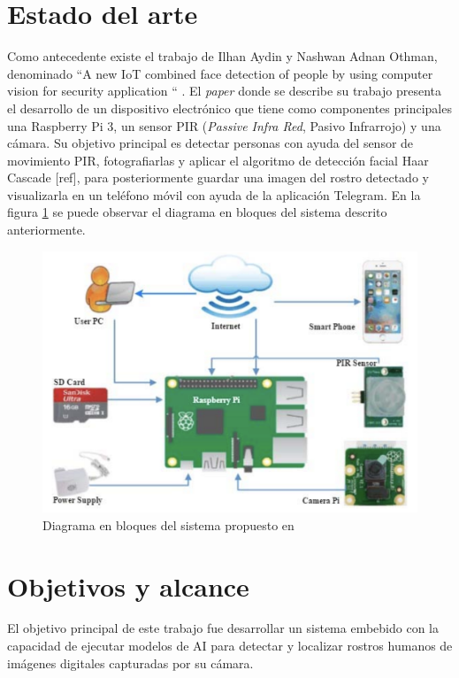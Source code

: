 \section{Estado del arte}
Como antecedente existe el trabajo de Ilhan Aydin y Nashwan Adnan Othman, denominado ``A new IoT combined face detection of people by using computer vision for security application
`` \cite{soa_ref}. El \textit{paper} donde se describe su trabajo presenta el desarrollo de un dispositivo electrónico que tiene como componentes principales una Raspberry Pi 3, un sensor PIR (\textit{Passive Infra Red}, Pasivo Infrarrojo) y una cámara. Su objetivo principal es detectar personas con ayuda del sensor de movimiento PIR, fotografiarlas y aplicar el algoritmo de detección facial Haar Cascade [ref], para posteriormente guardar una imagen del rostro detectado y visualizarla en un teléfono móvil con ayuda de la aplicación Telegram. En la figura \ref{fig:soa_arch} se puede observar el diagrama en bloques del sistema descrito anteriormente.

\begin{figure}[h]
	\centering
	\includegraphics[scale=0.4]{./Figures/soa_arch.png}
	\caption{Diagrama en bloques del sistema propuesto en \cite{soa_ref}}
	\label{fig:soa_arch}
\end{figure}

\section{Objetivos y alcance}
El objetivo principal de este trabajo fue desarrollar un sistema embebido con la capacidad de ejecutar modelos de AI para detectar y localizar rostros humanos de imágenes digitales capturadas por su cámara.

